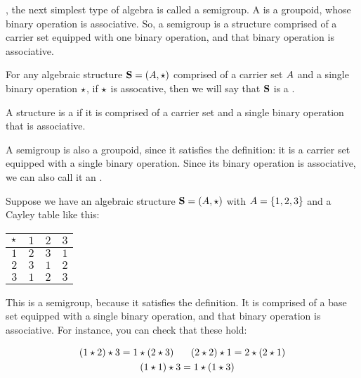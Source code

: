 \documentclass[../../../main.tex]{subfiles}
\begin{document}
, the next simplest type of algebra is called a semigroup. A  is a groupoid, whose binary operation is associative. So, a semigroup is a structure comprised of a carrier set equipped with one binary operation, and that binary operation is associative.

\begin{fdefinition}[Semigroup]
  \label{def:semigroup}
  For any algebraic structure $\algebra{S} = (\set{A}, \opSymbol/)$ comprised of a carrier set $A$ and a single binary operation $\opSymbol/$, if $\opSymbol/$ is assocative, then we will say that $\mathbf{S}$ is a .
\end{fdefinition}

\begin{terminology}
  A structure is a  if it is comprised of a carrier set and a single binary operation that is associative.
\end{terminology}

A semigroup is also a groupoid, since it satisfies the definition: it is a carrier set equipped with a single binary operation. Since its binary operation is associative, we can also call it an .

\begin{fexample}

Suppose we have an algebraic structure $\algebra{S} = (\set{A}, \opSymbol/)$ with $A = \{ 1, 2, 3 \}$ and a Cayley table like this:

\begin{center}
  \begin{tabular}{| c || c | c | c | }
    \hline
    $\opSymbol/$ & $1$ & $2$ & $3$ \\ \hline \hline
    $1$          & $2$ & $3$ & $1$ \\ \hline
    $2$          & $3$ & $1$ & $2$ \\ \hline
    $3$          & $1$ & $2$ & $3$ \\ \hline
  \end{tabular}
\end{center}

This is a semigroup, because it satisfies the definition. It is comprised of a base set equipped with a single binary operation, and that binary operation is associative. For instance, you can check that these hold: 

\begin{align*}
  \op{(\op{1}{2})}{3} = \op{1}{(\op{2}{3})} \hskip 0.25cm &~ \hskip 0.25cm
  \op{(\op{2}{2})}{1} = \op{2}{(\op{2}{1})} \\
  \op{(\op{1}{1})}{3} &= \op{1}{(\op{1}{3})}
\end{align*}

\end{fexample}
\end{document}
